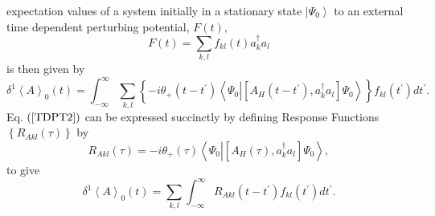 \documentclass[aps,preprint]{revtex4}%
\begin{document}
expectation values of a system initially in a stationary state $\left\vert
\Psi_{0}\right\rangle $ to an external time dependent perturbing potential,
$F(t)$,
\begin{equation}
F(t)=\sum_{k,l}f_{kl}\left(  t\right)  a_{k}^{\dagger}a_{l}%
\end{equation}
is then given by
\begin{equation}
\delta^{1}\left\langle A\right\rangle _{0}\left(  t\right)  =\int_{-\infty
}^{\infty}\sum_{k,l}\left\{  -i\theta_{+}\left(  t-t^{\prime}\right)
\left\langle \Psi_{0}\left\vert \left[  A_{H}\left(  t-t^{\prime}\right)
,a_{k}^{\dagger}a_{l}\right]  \right.  \Psi_{0}\right\rangle \right\}
f_{kl}\left(  t^{\prime}\right)  dt^{\prime}. \label{TDPT2}%
\end{equation}
Eq. $\left(  \ref{TDPT2}\right)  $ can be expressed succinctly by defining
Response Functions $\left\{  R_{Akl}\left(  \tau\right)  \right\}  $ by
\begin{equation}
R_{Akl}\left(  \tau\right)  =-i\theta_{+}\left(  \tau\right)  \left\langle
\Psi_{0}\left\vert \left[  A_{H}\left(  \tau\right)  ,a_{k}^{\dagger}%
a_{l}\right]  \right.  \Psi_{0}\right\rangle , \label{resdef}%
\end{equation}
to give
\begin{equation}
\delta^{1}\left\langle A\right\rangle _{0}\left(  t\right)  =\sum_{k,l}%
\int_{-\infty}^{\infty}R_{Akl}\left(  t-t^{\prime}\right)  f_{kl}\left(
t^{\prime}\right)  dt^{\prime}. \label{res}%
\end{equation}
\end{document}
